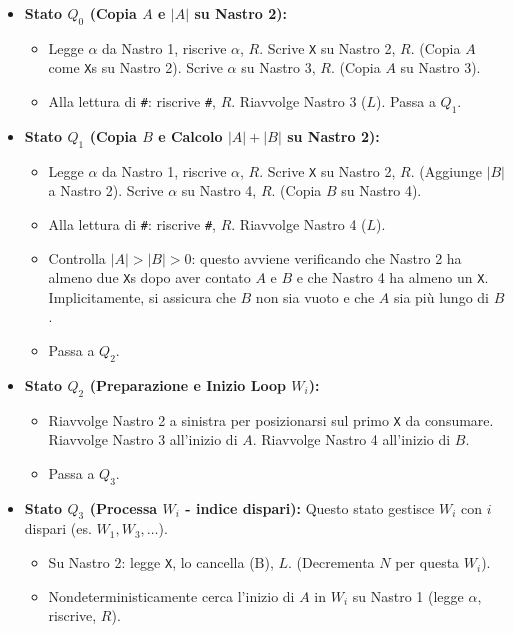 \documentclass[a4paper]{article}
\newcommand{\B}{\text{B}} %
\begin{document}
\begin{itemize}
    \item \textbf{Stato $Q_0$ (Copia $A$ e $|A|$ su Nastro 2):}
        \begin{itemize}
            \item Legge $\alpha$ da Nastro 1, riscrive $\alpha$, $R$. Scrive \texttt{X} su Nastro 2, $R$. (Copia $A$ come \texttt{X}s su Nastro 2). Scrive $\alpha$ su Nastro 3, $R$. (Copia $A$ su Nastro 3).
            \item Alla lettura di \texttt{\#}: riscrive \texttt{\#}, $R$. Riavvolge Nastro 3 ($L$). Passa a $Q_1$.
        \end{itemize}
    \item \textbf{Stato $Q_1$ (Copia $B$ e Calcolo $|A|+|B|$ su Nastro 2):}
        \begin{itemize}
            \item Legge $\alpha$ da Nastro 1, riscrive $\alpha$, $R$. Scrive \texttt{X} su Nastro 2, $R$. (Aggiunge $|B|$ a Nastro 2). Scrive $\alpha$ su Nastro 4, $R$. (Copia $B$ su Nastro 4).
            \item Alla lettura di \texttt{\#}: riscrive \texttt{\#}, $R$. Riavvolge Nastro 4 ($L$).
            \item Controlla $|A|>|B|>0$: questo avviene verificando che Nastro 2 ha almeno due \texttt{X}s dopo aver contato $A$ e $B$ e che Nastro 4 ha almeno un \texttt{X}. Implicitamente, si assicura che $B$ non sia vuoto e che $A$ sia più lungo di $B$.
            \item Passa a $Q_2$.
        \end{itemize}
    \item \textbf{Stato $Q_2$ (Preparazione e Inizio Loop $W_i$):}
        \begin{itemize}
            \item Riavvolge Nastro 2 a sinistra per posizionarsi sul primo \texttt{X} da consumare. Riavvolge Nastro 3 all'inizio di $A$. Riavvolge Nastro 4 all'inizio di $B$.
            \item Passa a $Q_3$.
        \end{itemize}
    \item \textbf{Stato $Q_3$ (Processa $W_i$ - indice dispari):}
        Questo stato gestisce $W_i$ con $i$ dispari (es. $W_1, W_3, \dots$).
        \begin{itemize}
            \item Su Nastro 2: legge \texttt{X}, lo cancella ($\B$), $L$. (Decrementa $N$ per questa $W_i$).
            \item Nondeterministicamente cerca l'inizio di $A$ in $W_i$ su Nastro 1 (legge $\alpha$, riscrive, $R$).

\end{itemize}
\end{itemize}
\end{document}
